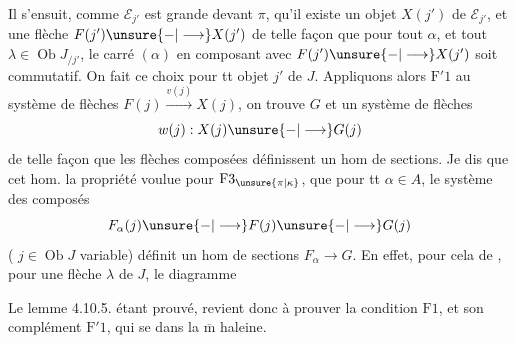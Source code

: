 Il s'ensuit, comme $\mathcal E_{j'}$ est grande devant $\pi$, qu'il existe un objet $X(j')$ de $\mathcal E_{j'}$, et une flèche  $F(j')\unsure{\mathbin{-}|\longrightarrow} X(j')$ de telle façon que pour tout $\alpha$, et tout $\lambda\in\operatorname{Ob}J_{/j'}$, le carré  
$(\alpha)$ en composant avec $F(j')\unsure{\mathbin{-}|\longrightarrow}X(j')$ soit commutatif. On  fait ce choix pour tt objet $j'$ de $J$. Appliquons alors $\mathrm F'1$  au système de flèches
$F(j)\xrightarrow{v(j)}X(j)$, on trouve $G$ et un système de flèches 
\[
 w(j):X(j)\unsure{\mathbin{-}|\longrightarrow}G(j)
\]
de telle façon que  les flèches composées
définissent un hom de sections\unsure{,|{}}. Je dis que cet hom.  la propriété voulue pour $\mathrm F3_{\unsure{\pi|\kappa}}$,  que pour tt $\alpha\in A$, le système des composés
\[
 F_{\alpha}(j)\unsure{\mathbin{-}|\longrightarrow} F(j)\unsure{\mathbin{-}|\longrightarrow}G(j)
\]
( $j\in\operatorname{Ob}J$ variable) définit un hom de sections $F_{\alpha}\longrightarrow G$. En effet,   pour cela de , pour une flèche $\lambda$ de $J$, le
diagramme

Le lemme 4.10.5. étant prouvé,  revient donc à prouver la condition $\mathrm F1$, et son complément $\mathrm F'1$, qui se  dans la $\overline{\mathrm m}$ haleine.

